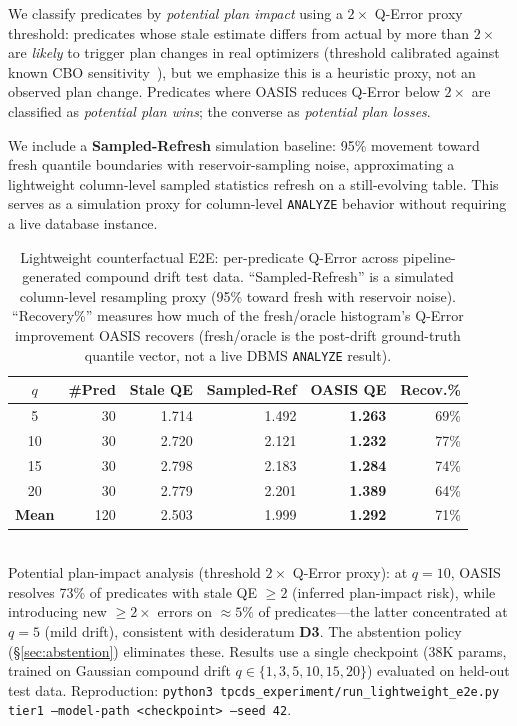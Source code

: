 \documentclass[runningheads]{llncs}
\begin{document}
We classify predicates by \emph{potential plan impact} using a $2\times$ Q-Error proxy threshold: predicates whose stale estimate differs from actual by more than $2\times$ are \emph{likely} to trigger plan changes in real optimizers (threshold calibrated against known CBO sensitivity~\cite{leis2015good}), but we emphasize this is a heuristic proxy, not an observed plan change. Predicates where OASIS reduces Q-Error below $2\times$ are classified as \emph{potential plan wins}; the converse as \emph{potential plan losses}.

We include a \textbf{Sampled-Refresh} simulation baseline: 95\% movement toward fresh quantile boundaries with reservoir-sampling noise, approximating a lightweight column-level sampled statistics refresh on a still-evolving table. This serves as a simulation proxy for column-level \texttt{ANALYZE} behavior without requiring a live database instance.

\begin{table}[t]
  \centering
  \caption{Lightweight counterfactual E2E: per-predicate Q-Error across pipeline-generated compound drift test data. ``Sampled-Refresh'' is a simulated column-level resampling proxy (95\% toward fresh with reservoir noise). ``Recovery\%'' measures how much of the fresh/oracle histogram's Q-Error improvement OASIS recovers (fresh/oracle is the post-drift ground-truth quantile vector, not a live DBMS \texttt{ANALYZE} result).}
  \label{tab:lightweight_e2e}
  \setlength{\tabcolsep}{5pt}
  \begin{tabular}{c r r r r r}
    \toprule
    $q$ & \#Pred & Stale QE & Sampled-Ref & OASIS QE & Recov.\% \\
    \midrule
     5 & 30 & 1.714 & 1.492 & \textbf{1.263} & 69\% \\
    10 & 30 & 2.720 & 2.121 & \textbf{1.232} & 77\% \\
    15 & 30 & 2.798 & 2.183 & \textbf{1.284} & 74\% \\
    20 & 30 & 2.779 & 2.201 & \textbf{1.389} & 64\% \\
    \midrule
    \textbf{Mean} & 120 & 2.503 & 1.999 & \textbf{1.292} & 71\% \\
    \bottomrule
  \end{tabular}
  \\[4pt]
  \small
  Potential plan-impact analysis (threshold $2\times$ Q-Error proxy): at $q{=}10$, OASIS resolves
  73\% of predicates with stale QE $\geq 2$ (inferred plan-impact risk), while
  introducing new ${\geq}2\times$ errors on ${\approx}5\%$ of predicates---the
  latter concentrated at $q{=}5$ (mild drift), consistent with desideratum
  \textbf{D3}. The abstention policy (\S\ref{sec:abstention}) eliminates these.
  Results use a single checkpoint (38K params, trained on Gaussian compound drift
  $q{\in}\{1,3,5,10,15,20\}$) evaluated on held-out test data.
  Reproduction: \texttt{python3 tpcds\_experiment/run\_lightweight\_e2e.py tier1
  --model-path <checkpoint> --seed 42}.
\end{table}
\end{document}
